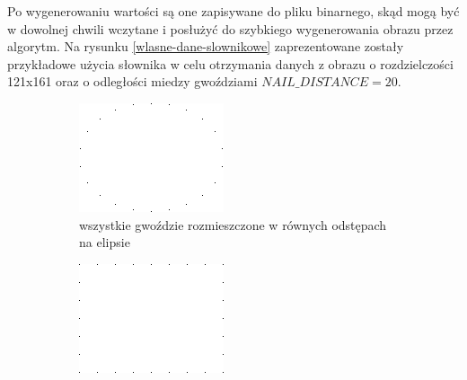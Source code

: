     Po wygenerowaniu wartości są one zapisywane do pliku binarnego, skąd mogą być w dowolnej chwili wczytane i posłużyć do szybkiego wygenerowania obrazu przez algorytm. Na rysunku \ref{wlasne-dane-slownikowe} zaprezentowane zostały przykładowe użycia słownika w celu otrzymania danych z obrazu o rozdzielczości 121x161 oraz o odległości miedzy gwoździami \(NAIL\_DISTANCE = 20\).
    \begin{figure}[H] 
    \centering
    \begin{subfigure}{0.49\textwidth}
        \centering
        \includegraphics[width = \textwidth]{img/4-mine/nails-on-elipse.png}
        \caption{wszystkie gwoździe rozmieszczone w równych odstępach na elipsie}
        \label{wlasne-dane-slownikowe-1}
    \end{subfigure}
    \begin{subfigure}{0.49\textwidth}
        \centering
        \includegraphics[width = \textwidth]{img/4-mine/nails-on-rectangle.png}

\end{subfigure}
\end{figure}
